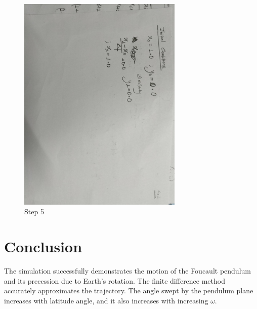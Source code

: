 \documentclass[12pt,a4paper]{article}
\begin{document}
\begin{figure}[H]
    \centering
    \includegraphics[width=0.7\textwidth,angle=90]{calc5.jpeg}
    \caption{Step 5}
\end{figure}

\section{Conclusion}
The simulation successfully demonstrates the motion of the Foucault pendulum and its precession
due to Earth's rotation. The finite difference method accurately approximates the trajectory. The angle swept
by the pendulum plane increases with latitude angle, and it also increases with increasing $\omega$.
\end{document}

